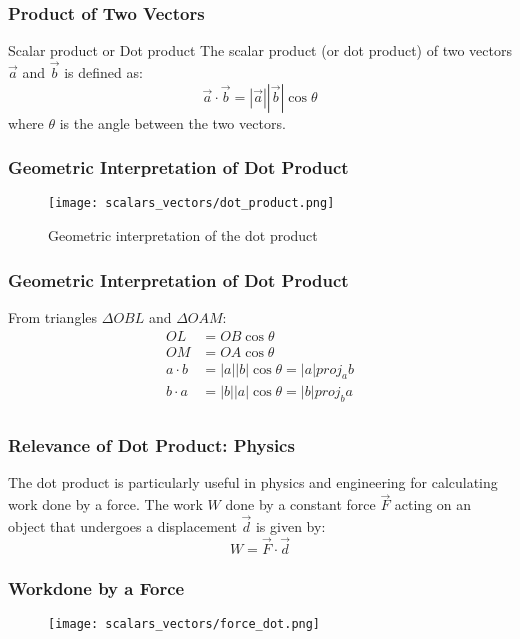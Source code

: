 \begin{frame}
    \frametitle{Product of Two Vectors}
    \begin{block}{Scalar product or Dot product}
        The scalar product (or dot product) of two vectors \(\vec{a}\) and \(\vec{b}\) is defined as:
        \[
        \vec{a} \cdot \vec{b} = |\vec{a}| |\vec{b}| \cos \theta
        \]
        where \(\theta\) is the angle between the two vectors.
        
    \end{block}
\end{frame}

\begin{frame}
    \frametitle{Geometric Interpretation of Dot Product}
    \begin{figure}
        \centering
        \texttt{[image: scalars\_vectors/dot\_product.png]}
        \caption{Geometric interpretation of the dot product}
    \end{figure}

\end{frame}

\begin{frame}
    \frametitle{Geometric Interpretation of Dot Product}
    From triangles \(\Delta OBL\) and \(\Delta OAM\):
    \begin{align*}
        OL &= OB \cos \theta \\
        OM &= OA \cos \theta  \\
        a \cdot b  &= |a| |b| \cos \theta = |a| proj_a b \\
        b \cdot a  &= |b| |a| \cos \theta = |b| proj_b a \\
    \end{align*}
\end{frame} 

\begin{frame}
\frametitle{Relevance of Dot Product: Physics}
The dot product is particularly useful in physics and engineering for calculating work done by a force. The work \(W\) done by a constant force \(\vec{F}\) acting on an object that undergoes a displacement \(\vec{d}\) is given by:
\[
W = \vec{F} \cdot \vec{d}
\]
\end{frame}

\begin{frame}
    \frametitle{Workdone by a Force}
    \begin{figure}
        \centering
        \texttt{[image: scalars\_vectors/force\_dot.png]}
    \end{figure}
\end{frame}

